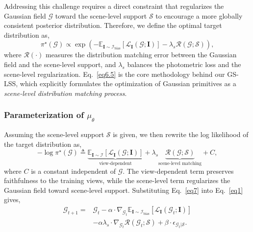 \documentclass[lettersize,journal]{IEEEtran}
\begin{document}
Addressing this challenge requires a direct constraint that regularizes the Gaussian field $\mathcal{G}$ toward the scene-level support $\mathcal{S}$ to encourage a more globally consistent posterior distribution.
Therefore, we define the optimal target distribution as,
\begin{equation}
    \pi^{\star} (\mathcal{G}) \propto \exp \left( - \mathbb{E}_{\mathbf{I}\sim\mathcal{I}_{\text{bias}}}\!\left[\mathcal{L}_{\mathbf{I}}(\mathcal{G};\mathbf{I})\right] - \lambda_{s} \mathcal{R}(\mathcal{G};\mathcal{S}) \right),
    \label{eq6.5}
\end{equation}
where $\mathcal{R}(\cdot)$ measures the distribution matching error between the Gaussian field and the scene-level support, and $\lambda_{s}$ balances the photometric loss and the scene-level regularization. Eq.~\ref{eq6.5} is the core methodology behind our GS-LSS, which explicitly formulates the optimization of Gaussian primitives as a \emph{scene-level distribution matching process}.

\subsubsection{Parameterization of \texorpdfstring{$\mu_{\theta}$}{mu-theta}}

Assuming the scene-level support $\mathcal{S}$ is given, we then rewrite the log likelihood of the target distribution as, 
\begin{equation}
    -\log \pi^{\star} (\mathcal{G}) \triangleq \underbrace{\mathbb{E}_{\mathbf{I}\sim\mathcal{I}}\!\left[\mathcal{L}_{\mathbf{I}}(\mathcal{G};\mathbf{I})\right]}_{\text{view-dependent}}
    + \lambda_{s} \underbrace{\mathcal{R}(\mathcal{G};\mathcal{S})}_{\text{scene-level matching}} + C,
    \label{eq7}
\end{equation}
where $C$ is a constant independent of $\mathcal{G}$. The view-dependent term preserves faithfulness to the training views, while the scene-level term regularizes the Gaussian field toward scene-level support. Substituting Eq.~\ref{eq7} into Eq.~\ref{eq1} gives, 
\begin{equation}
    \begin{aligned}
    \mathcal{G}_{t+1} = &\mathcal{G}_t - \alpha \cdot \nabla_{\mathcal{G}_t} \mathbb{E}_{\mathbf{I}\sim\mathcal{I}_{\text{bias}}}\!\left[\mathcal{L}_{\mathbf{I}}(\mathcal{G}_t;\mathbf{I})\right] \\
    &- \alpha \lambda_s \cdot \nabla_{\mathcal{G}_t} \mathcal{R}(\mathcal{G}_t;\mathcal{S}) + \beta \cdot \epsilon_{\mathcal{G}_t \vert \mathcal{S}}.
    \end{aligned}
    \label{eq8}
\end{equation} 
\end{document}
